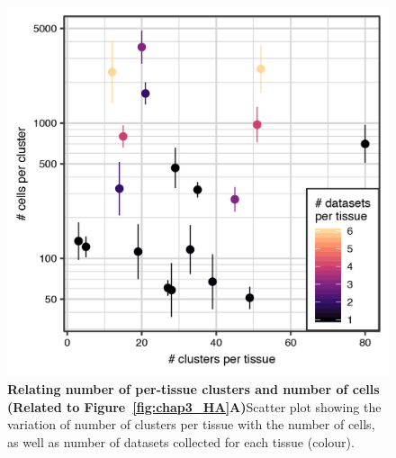 \begin{figure}[hb!] 
\centering    
\includegraphics[scale=1.1]{Appendix3/Figs/tissue_cluster_dataset_numbers_HumanAtlas.png} %
\caption[Relating number of per-tissue clusters and number of cells]{\textbf{Relating number of per-tissue clusters and number of cells (Related to Figure~\ref{fig:chap3_HA}A)}\newline Scatter plot showing the variation of number of clusters per tissue with the number of cells, as well as number of datasets collected for each tissue (colour).}
\label{fig:appB_clustnumbs}
\end{figure}


